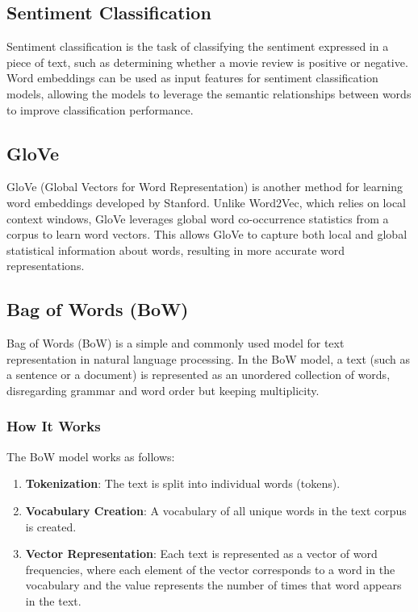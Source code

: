 \documentclass[12pt]{article}
\begin{document}
\subsection{Sentiment Classification}
Sentiment classification is the task of classifying the sentiment expressed in a piece of text, such as determining whether a movie review is positive or negative. Word embeddings can be used as input features for sentiment classification models, allowing the models to leverage the semantic relationships between words to improve classification performance.

\subsection{GloVe}
GloVe (Global Vectors for Word Representation) is another method for learning word embeddings developed by Stanford. Unlike Word2Vec, which relies on local context windows, GloVe leverages global word co-occurrence statistics from a corpus to learn word vectors. This allows GloVe to capture both local and global statistical information about words, resulting in more accurate word representations.

\subsection{Bag of Words (BoW)}
Bag of Words (BoW) is a simple and commonly used model for text representation in natural language processing. In the BoW model, a text (such as a sentence or a document) is represented as an unordered collection of words, disregarding grammar and word order but keeping multiplicity.

\subsubsection{How It Works}
The BoW model works as follows:
\begin{enumerate}
    \item \textbf{Tokenization}: The text is split into individual words (tokens).
    \item \textbf{Vocabulary Creation}: A vocabulary of all unique words in the text corpus is created.
    \item \textbf{Vector Representation}: Each text is represented as a vector of word frequencies, where each element of the vector corresponds to a word in the vocabulary and the value represents the number of times that word appears in the text.
\end{enumerate}
\end{document}
